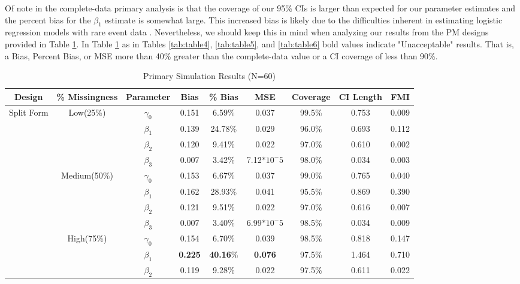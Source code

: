 \documentclass{svjour3}                     %
\begin{document}
Of note in the complete-data primary analysis is that the coverage of our 95\% CIs is larger than expected for our parameter estimates and the percent bias for the $\beta_1$ estimate is somewhat large. This increased bias is likely due to the difficulties inherent in estimating logistic regression models with rare event data \citep{king2001logistic}. Nevertheless, we should keep this in mind when analyzing our results from the PM designs provided in Table \ref{tab:table3}. In Table \ref{tab:table3} as in Tables \ref{tab:table4}, \ref{tab:table5}, and \ref{tab:table6} bold values indicate "Unacceptable" results. That is, a Bias, Percent Bias, or MSE more than 40\% greater than the complete-data value or a CI coverage of less than 90\%.




\begin{table}[p]
	\centering
	\caption{Primary Simulation Results (N=60)}
	\setlength{\tabcolsep}{0.1cm}
	\label{tab:table3}
	\hspace*{-1cm}
	\begin{tabular}{c|c|c|cccccc}
		\toprule
		Design & \% Missingness & Parameter & Bias & \% Bias & MSE & Coverage & CI Length & FMI \\
		\midrule
		\multirow{12}{*}{Split Form}
		& \multirow{4}{*}{Low(25\%)}
		& $\gamma_0$ & 0.151 & 6.59\% & 0.037 & 99.5\% & 0.753 & 0.009 \\
		&& $\beta_1$ & 0.139 & 24.78\% & 0.029 & 96.0\% & 0.693 & 0.112 \\
		&& $\beta_2$ & 0.120 & 9.41\% & 0.022 & 97.0\% & 0.610 & 0.002 \\
		&& $\beta_3$ & 0.007 & 3.42\% & 7.12$*10^-5$ & 98.0\% & 0.034 & 0.003 \\ \cline{2-9} \noalign{\smallskip}
		&\multirow{4}{*}{Medium(50\%)}
		& $\gamma_0$ & 0.153 & 6.67\% & 0.037 & 99.0\% & 0.765 & 0.040 \\
		&& $\beta_1$ & 0.162 & 28.93\% & 0.041 & 95.5\% & 0.869 & 0.390 \\
		&& $\beta_2$ & 0.121 & 9.51\% & 0.022 & 97.0\% & 0.616 & 0.007 \\
		&& $\beta_3$ & 0.007 & 3.40\% & 6.99$*10^-5$ & 98.5\% & 0.034 & 0.009 \\ \cline{2-9} \noalign{\smallskip}
		& \multirow{4}{*}{High(75\%)}
		& $\gamma_0$ & 0.154 & 6.70\% & 0.039 & 98.5\% & 0.818 & 0.147 \\
		&& $\beta_1$ & \textbf{0.225} & \textbf{40.16}\% & \textbf{0.076} & 97.5\% & 1.464 & 0.710 \\
		&& $\beta_2$ & 0.119 & 9.28\% & 0.022 & 97.5\% & 0.611 & 0.022 \\

\end{tabular}
\end{table}
\end{document}

